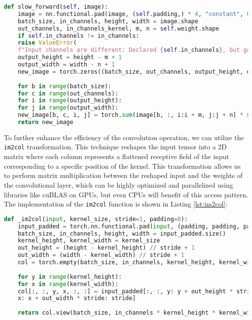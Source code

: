 \documentclass[../report.tex]{subfiles}
\begin{document}
\begin{lstlisting}[style=python, language=python, label={slowconvolution}, caption={Slow convolution implementation}]
def slow_forward(self, image):
	image = nn.functional.pad(image, (self.padding,) * 4, "constant", 0)
	batch_size, in_channels, height, width = image.shape
	out_channels, in_channels_kernel, m, n = self.weight.shape
	if self.in_channels != in_channels:
	raise ValueError(
	f"Input channels are different: Declared {self.in_channels}, but got Image with {in_channels}")
	output_height = height - m + 1
	output_width = width - n + 1
	new_image = torch.zeros((batch_size, out_channels, output_height, output_width))
	
	for b in range(batch_size):
	for c in range(out_channels):
	for i in range(output_height):
	for j in range(output_width):
	new_image[b, c, i, j] = torch.sum(image[b, :, i:i + m, j:j + n] * self.weight[c]) + self.bias[c]
	return new_image
\end{lstlisting}
To further enhance the efficiency of the convolution operation, we can utilize the \texttt{im2col} transformation. This technique reshapes the input tensor into a 2D matrix where each column represents a flattened receptive field of the input corresponding to a specific position of the kernel. This transformation allows us to perform matrix multiplication between the reshaped input and the weights of the convolutional layer, which can be highly optimized and parallelized using libraries like cuBLAS on GPUs, but even CPUs will benefit of this access pattern.
The implementation of the \texttt{im2col} function is shown in Listing \ref{lst:im2col}:
\begin{lstlisting}[style=python, language=python, label={lst:im2col}, caption={im2col tranformation algorithm}]
	def _im2col(input, kernel_size, stride=1, padding=0):
	input_padded = torch.nn.functional.pad(input, (padding, padding, padding, padding))
	batch_size, in_channels, height, width = input_padded.size()
	kernel_height, kernel_width = kernel_size
	out_height = (height - kernel_height) // stride + 1
	out_width = (width - kernel_width) // stride + 1
	col = torch.empty(batch_size, in_channels, kernel_height, kernel_width, out_height, out_width)
	
	for y in range(kernel_height):
	for x in range(kernel_width):
	col[:, :, y, x, :, :] = input_padded[:, :, y: y + out_height * stride: stride,
	x: x + out_width * stride: stride]
	
	return col.view(batch_size, in_channels * kernel_height * kernel_width, -1)
\end{lstlisting}
\end{document}
